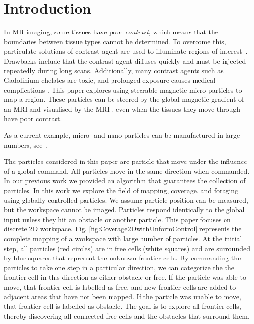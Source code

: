 \section{Introduction}\label{sec:Intro}
In MR imaging, some tissues have poor \emph{contrast}, which means that the boundaries between tissue types cannot be determined.
 To overcome this, particulate solutions of contrast agent are used to illuminate regions of interest~\cite{na2009inorganic}. 
 Drawbacks include that the contrast agent diffuses quickly and must be injected repeatedly during long scans. 
 Additionally, many contrast agents such as Gadolinium chelates are toxic, and prolonged exposure causes medical complications \cite{caravan1999gadolinium}. 
This paper explores using steerable magnetic micro particles to map a region. 
These particles can be steered by the global magnetic gradient of an MRI and visualised by the MRI \cite{Vartholomeos2012}, even when the tissues they move through  have poor contrast.

As a current example, micro- and nano-particles can be manufactured in large numbers, see~\cite{Chowdhury2015,martel2014computer,kim2015imparting,Donald2013,Ghosh2009,Ou2013,qiu2015magnetic}.

The particles considered in this paper are particle that move under the influence of a global command. All particles move in the same direction when commanded. 
In our previous work \cite{mahadev2016collecting} we provided an algorithm that guarantees the collection of particles.
 In this work we explore the field of mapping, coverage, and foraging using globally controlled particles. 
 We assume particle position can be measured, but the workspace cannot be imaged. 
 Particles respond identically to the global input unless they hit an obstacle or another particle. 
 This paper focuses on discrete 2D workspace.
Fig. \ref{fig:Coverage2DwithUnformControl} represents the complete mapping of a workspace with large number of particles.  
At the initial step, all  particles (red circles) are in free cells (white squares) and are surrounded by blue squares that represent the unknown frontier cells.
By commanding the particles to take one step in a particular direction, we can categorize the the frontier cell in this direction as either obstacle or free.
 If the particle was able to move, that frontier cell is labelled as free, and new frontier cells are added to adjacent areas that have not been mapped.
 If the particle was unable to move, that frontier cell is labelled as obstacle.
The goal is to explore all  frontier cells, thereby discovering all connected free cells and the obstacles that surround them. 


